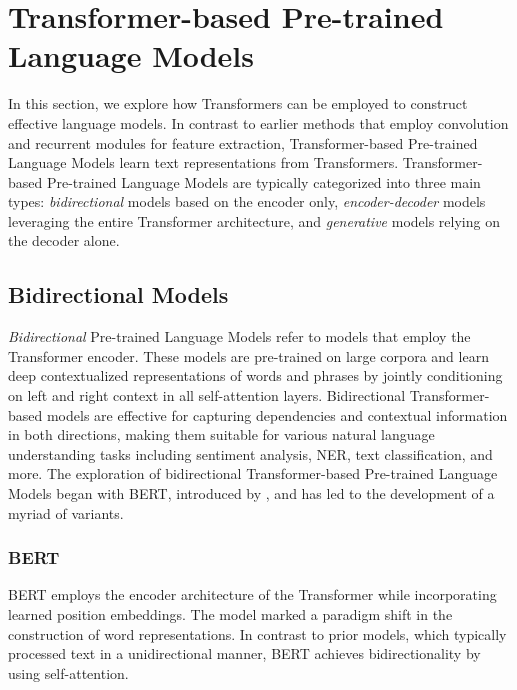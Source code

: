 \section{Transformer-based Pre-trained Language Models}

In this section, we explore how Transformers can be employed to construct effective language models. In contrast to earlier methods that employ convolution and recurrent modules for feature extraction, Transformer-based Pre-trained Language Models learn text representations from Transformers. Transformer-based Pre-trained Language Models are typically categorized into three main types: \textit{bidirectional} models based on the encoder only, \textit{encoder-decoder} models leveraging the entire Transformer architecture, and \textit{generative} models relying on the decoder alone.

\subsection{Bidirectional Models}

\textit{Bidirectional} Pre-trained Language Models refer to models that employ the Transformer encoder. These models are pre-trained on large corpora and learn deep contextualized representations of words and phrases by jointly conditioning on left and right context in all self-attention layers. Bidirectional Transformer-based models are effective for capturing dependencies and contextual information in both directions, making them suitable for various natural language understanding tasks including sentiment analysis, \ac{NER}, text classification, and more. The exploration of bidirectional Transformer-based Pre-trained Language Models began with \ac{BERT}, introduced by \citet{devlin2018bert}, and has led to the development of a myriad of variants.

\subsubsection{BERT}
\label{section:related-pretrained-language-models-bert}

\ac{BERT} employs the encoder architecture of the Transformer while incorporating learned position embeddings. The model marked a paradigm shift in the construction of word representations. In contrast to prior models, which typically processed text in a unidirectional manner, BERT achieves bidirectionality by using self-attention.

